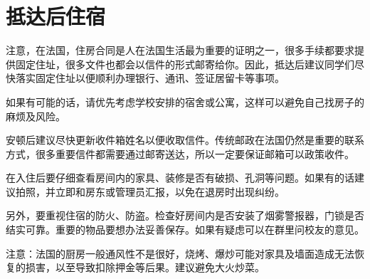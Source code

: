\section{抵达后住宿}

注意，在法国，住房合同是人在法国生活最为重要的证明之一，很多手续都要求提供固定住址，很多文件也都会以信件的形式邮寄给你。因此，抵达后建议同学们尽快落实固定住址以便顺利办理银行、通讯、签证居留卡等事项。

如果有可能的话，请优先考虑学校安排的宿舍或公寓，这样可以避免自己找房子的麻烦及风险。

安顿后建议尽快更新收件箱姓名以便收取信件。传统邮政在法国仍然是重要的联系方式，很多重要信件都需要通过邮寄送达，所以一定要保证邮箱可以政策收件。

在入住后要仔细查看房间内的家具、装修是否有破损、孔洞等问题。如果有的话建议拍照，并立即和房东或管理员汇报，以免在退房时出现纠纷。

另外，要重视住宿的防火、防盗。检查好房间内是否安装了烟雾警报器，门锁是否结实可靠。重要的物品要想办法妥善保存。如果有疑虑可以在群里问校友的意见。

注意：法国的厨房一般通风性不是很好，烧烤、爆炒可能对家具及墙面造成无法恢复的损害，以至导致扣除押金等后果。建议避免大火炒菜。






